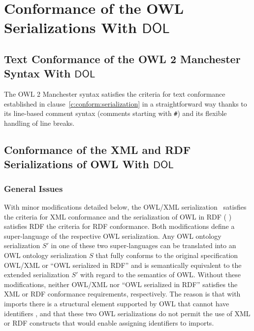 \documentclass[10pt,fleqn,final]{scrreprt}
\makeatletter
\newcommand*\CommentAuthor{}
\renewcommand*\CommentAuthor{#1}}
\newcommand*\CommentDate{}
\renewcommand*\CommentDate{#1}}
\newcommand*\CommentId{}
\renewcommand*\CommentId{#1}}
\newcommand*\CommentType{}
\renewcommand*\CommentType{#1}}
\newcommand*{\SetCommentColorByType}[1]{%
\edef\localType{{#1}}%
\expandafter\ifstrequal\localType{q-aut}{\colorlet{CommentColor}{red}}{%
\expandafter\ifstrequal\localType{q-all}{\colorlet{CommentColor}{orange}}{%
\expandafter\ifstrequal\localType{todo}{\colorlet{CommentColor}{orange}}{%
\expandafter\ifstrequal\localType{fyi}{\colorlet{CommentColor}{lightgray}}{%
\colorlet{CommentColor}{yellow}}}}}}
\newcommand*{\SetCommentPrefixByType}[1]{%
\edef\localType{{#1}}%
\expandafter\@ifmtarg\localType{%
\edef\CommentPrefix{}%
}{%
\caseupper[q]{#1}%
\edef\CommentPrefix{\thestring: }%
}}
\newcommand*{\initComment}[1]{%
\setkeys{Comment}{#1}%
\SetCommentColorByType{\CommentType}%
\relax%
\SetCommentPrefixByType{\CommentType}%
\relax%
}
\newcommand*{\todonote}[2][]{%
\initComment{#1}%
\pdfcomment[author=\CommentAuthor,color=CommentColor,date=\CommentDate,id=\CommentId]{%
\CommentPrefix
#2}}
\renewcommand*{\todonote}[2][]{%
\initComment{#1}%
\ednote{\CommentPrefix #2}}
\newcommand*{\CLnote}[2][author=Christoph Lange]{%
\todonote[author=Christoph Lange,#1]{#2} 
}
\newcommand*{\DOL}{\ensuremath{\mathsf{DOL}}\xspace}
\newcommand{\noterefname}{note}
\newcommand{\nref}[1]{\noterefname~\ref{#1}}
\renewcommand{\nref}[1]{\ref{nref-#1}} %
\newenvironment{definitions}[0]{\medskip }{}
\providecommand{\DIFadd}[1]{{\protect\color{blue}\uwave{#1}}} %
\providecommand{\DIFaddbegin}{} %
\providecommand{\DIFaddend}{} %
\providecommand{\DIFdelbegin}{} %
\providecommand{\DIFdelend}{} %
\makeatother
\begin{document}
\begin{definitions}
\DIFaddend \section{Conformance of the OWL Serializations With \DOL}\label{a:owl-serializations}

\subsection{Text Conformance of the OWL 2 Manchester Syntax With \DOL}

The OWL 2 Manchester syntax satisfies the criteria for text conformance established in clause~\ref{c:conform:serialization} in a straightforward way thanks to its line-based comment syntax (comments starting with \texttt{\#}) and its flexible handling of line breaks.

\subsection{Conformance of the XML and RDF Serializations of OWL With \DOL}\DIFaddbegin \label{sec:conformance-owl-xml-rdf}
\DIFaddend 

\subsubsection{General Issues}

With minor modifications detailed below, the OWL/XML serialization~\cite{W3C:REC-owl2-xml-serialization-20121211} satisfies the criteria for XML conformance and the serialization of OWL in RDF (\DIFdelbegin %
\DIFdelend \DIFaddbegin \DIFadd{\nref{OWL2RDF}}\DIFaddend ) satisfies RDF the criteria for RDF conformance. %
Both modifications define a super-language of the respective OWL serialization.
Any OWL ontology serialization $S'$ in one of these two super-languages can be translated into an OWL ontology serialization $S$ that fully conforms to the original specification OWL/XML or ``OWL serialized in RDF'' and is semantically equivalent to the extended serialization $S'$ with regard to the semantics of OWL.
Without these modifications, neither OWL/XML nor ``OWL serialized in RDF'' satisfies the XML or RDF conformance requirements, respectively.
The reason is that with imports there is a structural element supported by OWL that cannot have identifiers \DIFaddbegin \DIFadd{nor carry annotations}\DIFaddend , and that these two OWL serializations do not permit the use of XML or RDF constructs that would enable assigning identifiers to imports.


\end{definitions}
\end{document}

